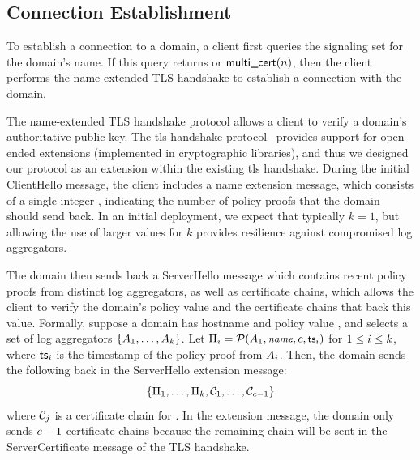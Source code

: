 \subsection{Connection Establishment}
\label{sec:design:handshake}

To establish a connection to a domain, a client first queries the 
signaling set for the domain's name.
If this query returns
\onecert or $\textsf{multi\_cert}(n)$, then the client performs the \ac{name}-extended
TLS handshake to establish a connection with the domain.

The \ac{name}-extended TLS handshake protocol allows a client to verify a domain's
authoritative public key. The \ac{tls} handshake protocol~\cite{rfc5246}
provides support for open-ended extensions (implemented in cryptographic
libraries), and thus we designed our protocol as an extension within the
existing \ac{tls} handshake. During the initial ClientHello message, the client
includes a \ac{name} extension message, which consists of a single integer
\numlas, indicating the number of policy proofs that the domain should send back.
In an initial deployment, we expect that typically $k=1$,
but allowing the use of larger values for $k$ provides resilience
against compromised log aggregators.

The domain then sends back a ServerHello message which contains \numlas recent
policy proofs from \numlas distinct log aggregators, as well as \numlas
certificate chains, which allows the client to verify the domain's policy value
and the certificate chains that back this value. Formally, suppose a domain has
hostname \hostname and policy value \policy, and selects a set of log
aggregators $\{A_1, \ldots, A_k\}$. Let $\Pi_i =
\mathcal{P}(A_1, \small{\emph{name}}, c, \textsf{ts}_i)$ for $1 \le i \le
k$, where $\textsf{ts}_i$ is the timestamp of the policy proof from
$A_i$. Then, the domain sends the following back in the ServerHello
extension message:
\begin{equation}
  \{\Pi_1, \ldots, \Pi_k, \mathcal{C}_1,
  \ldots, \mathcal{C}_{c - 1}\}
\end{equation}
where $\mathcal{C}_j$ is a certificate chain for \hostname. In the extension
message, the domain only sends $c - 1$ certificate chains because the
remaining chain will be sent in the ServerCertificate message of the TLS
handshake.

